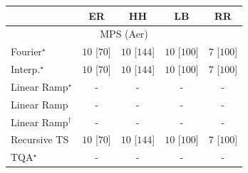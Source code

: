 \begin{tabular}{l|cccc|}
\toprule
            & ER & HH & LB & RR \\
\midrule
\multicolumn{5}{c}{\rule{0pt}{8pt}MPS (Aer)} \\
\midrule
Fourier$^\star$ & {\cellcolor[HTML]{00441B}} \color[HTML]{F1F1F1} $10$ [$70$] & {\cellcolor[HTML]{00441B}} \color[HTML]{F1F1F1} $10$ [$144$] & {\cellcolor[HTML]{00441B}} \color[HTML]{F1F1F1} $10$ [$100$] & {\cellcolor[HTML]{37A055}} \color[HTML]{F1F1F1} $7$ [$100$] \\
Interp.$^\star$ & {\cellcolor[HTML]{00441B}} \color[HTML]{F1F1F1} $10$ [$70$] & {\cellcolor[HTML]{00441B}} \color[HTML]{F1F1F1} $10$ [$144$] & {\cellcolor[HTML]{00441B}} \color[HTML]{F1F1F1} $10$ [$100$] & {\cellcolor[HTML]{37A055}} \color[HTML]{F1F1F1} $7$ [$100$] \\
Linear Ramp$^\star$ & {\cellcolor[HTML]{000000}} \color[HTML]{F1F1F1} {\cellcolor{white}} \color{black} - & {\cellcolor[HTML]{000000}} \color[HTML]{F1F1F1} {\cellcolor{white}} \color{black} - & {\cellcolor[HTML]{000000}} \color[HTML]{F1F1F1} {\cellcolor{white}} \color{black} - & {\cellcolor[HTML]{000000}} \color[HTML]{F1F1F1} {\cellcolor{white}} \color{black} - \\
Linear Ramp & {\cellcolor[HTML]{000000}} \color[HTML]{F1F1F1} {\cellcolor{white}} \color{black} - & {\cellcolor[HTML]{000000}} \color[HTML]{F1F1F1} {\cellcolor{white}} \color{black} - & {\cellcolor[HTML]{000000}} \color[HTML]{F1F1F1} {\cellcolor{white}} \color{black} - & {\cellcolor[HTML]{000000}} \color[HTML]{F1F1F1} {\cellcolor{white}} \color{black} - \\
Linear Ramp$^\dagger$ & {\cellcolor[HTML]{000000}} \color[HTML]{F1F1F1} {\cellcolor{white}} \color{black} - & {\cellcolor[HTML]{000000}} \color[HTML]{F1F1F1} {\cellcolor{white}} \color{black} - & {\cellcolor[HTML]{000000}} \color[HTML]{F1F1F1} {\cellcolor{white}} \color{black} - & {\cellcolor[HTML]{000000}} \color[HTML]{F1F1F1} {\cellcolor{white}} \color{black} - \\
Recursive TS & {\cellcolor[HTML]{00441B}} \color[HTML]{F1F1F1} $10$ [$70$] & {\cellcolor[HTML]{00441B}} \color[HTML]{F1F1F1} $10$ [$144$] & {\cellcolor[HTML]{00441B}} \color[HTML]{F1F1F1} $10$ [$100$] & {\cellcolor[HTML]{37A055}} \color[HTML]{F1F1F1} $7$ [$100$] \\
TQA$^\star$ & {\cellcolor[HTML]{000000}} \color[HTML]{F1F1F1} {\cellcolor{white}} \color{black} - & {\cellcolor[HTML]{000000}} \color[HTML]{F1F1F1} {\cellcolor{white}} \color{black} - & {\cellcolor[HTML]{000000}} \color[HTML]{F1F1F1} {\cellcolor{white}} \color{black} - & {\cellcolor[HTML]{000000}} \color[HTML]{F1F1F1} {\cellcolor{white}} \color{black} - \\

\end{tabular}
